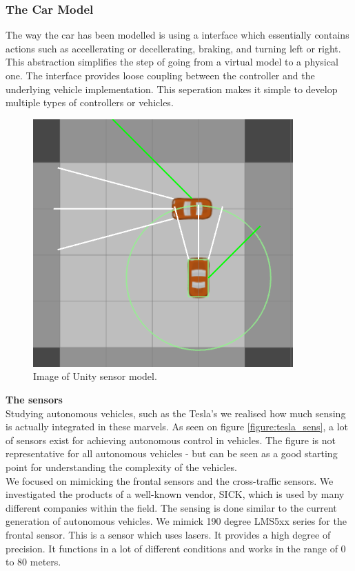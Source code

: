\subsubsection{The Car Model}
The way the car has been modelled is using a interface which essentially contains actions such as accellerating or decellerating, braking, and turning left or right.
This abstraction simplifies the step of going from a virtual model to a physical one.
The interface provides loose coupling between the controller and the underlying vehicle implementation.
This seperation makes it simple to develop multiple types of controllers or vehicles.\\

\begin{figure}
\centering
\includegraphics[scale=.5]{img/sensors}
\caption{Image of Unity sensor model.}
\label{figure:unity_sens}
\end{figure}

\noindent
\textbf{The sensors}\\
Studying autonomous vehicles, such as the Tesla's we realised how much sensing is actually integrated in these marvels.
As seen on figure \ref{figure:tesla_sens}, a lot of sensors exist for achieving autonomous control in vehicles.
The figure is not representative for all autonomous vehicles - but can be seen as a good starting point for understanding the complexity of the vehicles.\\

We focused on mimicking the frontal sensors and the cross-traffic sensors.
We investigated the products of a well-known vendor, SICK, which is used by many different companies within the field.
The sensing is done similar to the current generation of autonomous vehicles. We mimick 190 degree LMS5xx series for the frontal sensor. This is a sensor which uses lasers. It provides a high degree of precision. It functions in a lot of different conditions and works in the range of 0 to 80 meters.

